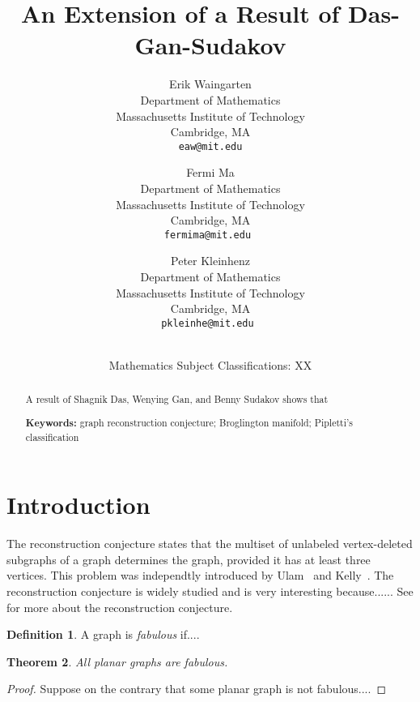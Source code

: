 \documentclass[12pt]{article}
\title{\bf An Extension of a Result of Das-Gan-Sudakov}
\author{Erik Waingarten\\
\small Department of Mathematics\\[-0.8ex]
\small Massachusetts Institute of Technology\\[-0.8ex] 
\small Cambridge, MA\\
\small\tt eaw@mit.edu\\
\and
Fermi Ma\\
\small Department of Mathematics\\[-0.8ex]
\small Massachusetts Institute of Technology\\[-0.8ex]
\small Cambridge, MA\\
\small\tt fermima@mit.edu
\and
Peter Kleinhenz\\
\small Department of Mathematics\\[-0.8ex]
\small Massachusetts Institute of Technology\\[-0.8ex]
\small Cambridge, MA\\
\small\tt pkleinhe@mit.edu
}
\date{\dateline{August 1, 2014}{XX}\\
\small Mathematics Subject Classifications: XX}
\theoremstyle{plain}
\newtheorem{theorem}{Theorem}
\theoremstyle{definition}
\newtheorem{definition}[theorem]{Definition}
\theoremstyle{remark}
\begin{document}
\maketitle


\begin{abstract}
  A result of Shagnik Das, Wenying Gan, and Benny Sudakov shows that

  \bigskip\noindent \textbf{Keywords:} graph reconstruction
  conjecture; Broglington manifold; Pipletti's classification
\end{abstract}

\section{Introduction}

The reconstruction conjecture states that the multiset of unlabeled
vertex-deleted subgraphs of a graph determines the graph, provided it
has at least three vertices.  This problem was independtly introduced
by Ulam~\cite{Ulam} and Kelly~\cite{Kelly}.  The reconstruction
conjecture is widely studied
\cite{Bollobas,FGH,HHRT,KSU,RM,RR,Stockmeyer} and is very interesting
because...... See \cite{WikipediaReconstruction} for more about the
reconstruction conjecture.

\begin{definition} 
  A graph is \emph{fabulous} if....
\end{definition}

\begin{theorem}
  \label{Thm:FabGraphs}
  All planar graphs are fabulous.
\end{theorem}

\begin{proof}
  Suppose on the contrary that some planar graph is not fabulous....
\end{proof}
\end{document}
